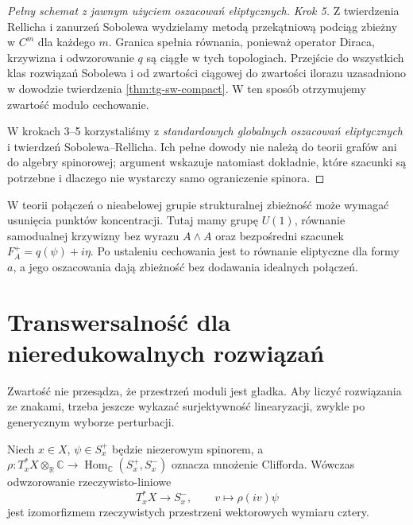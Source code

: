 \begin{proof}[Pełny schemat z jawnym użyciem oszacowań eliptycznych]
\emph{Krok 5.} Z twierdzenia Rellicha i zanurzeń Sobolewa
wydzielamy metodą przekątniową podciąg zbieżny w $C^m$
dla każdego $m$. Granica spełnia równania, ponieważ
operator Diraca, krzywizna i odwzorowanie $q$ są ciągłe
w tych topologiach. Przejście do wszystkich klas
rozwiązań Sobolewa i od zwartości ciągowej
do zwartości ilorazu uzasadniono w dowodzie
twierdzenia \ref{thm:tg-sw-compact}.
W ten sposób otrzymujemy zwartość modulo cechowanie.

W krokach 3--5 korzystaliśmy z \emph{standardowych globalnych
oszacowań eliptycznych} i twierdzeń Sobolewa--Rellicha.
Ich pełne dowody nie należą do teorii grafów ani do
algebry spinorowej; argument wskazuje natomiast dokładnie,
które szacunki są potrzebne i dlaczego nie wystarczy samo
ograniczenie spinora.
\end{proof}

\begin{uwaga}
W teorii połączeń o nieabelowej grupie strukturalnej
zbieżność może wymagać usunięcia punktów koncentracji.
Tutaj mamy grupę $U(1)$, równanie samodualnej krzywizny
bez wyrazu $A\wedge A$ oraz bezpośredni szacunek
$F_A^+=q(\psi)+i\eta$. Po ustaleniu cechowania jest to
równanie eliptyczne dla formy $a$, a jego oszacowania
dają zbieżność bez dodawania idealnych połączeń.
\end{uwaga}

\section{Transwersalność dla nieredukowalnych rozwiązań}
\label{sec:tg-sw12-transversality}

Zwartość nie przesądza, że przestrzeń moduli jest gładka.
Aby liczyć rozwiązania ze znakami, trzeba jeszcze wykazać
surjektywność linearyzacji, zwykle po generycznym wyborze
perturbacji.

\begin{lemat}
\label{lem:tg-sw12-clifford-real-iso}
Niech $x\in X$, $\psi\in S_x^+$ będzie
niezerowym spinorem, a
$\rho:T_x^*X\otimes_{\mathbb R}\mathbb C
\to\operatorname{Hom}_{\mathbb C}(S_x^+,S_x^-)$
oznacza mnożenie Clifforda.
Wówczas odwzorowanie rzeczywisto-liniowe
\[
T_x^*X\longrightarrow S_x^-,
\qquad v\longmapsto\rho(iv)\psi
\]
jest izomorfizmem rzeczywistych przestrzeni
wektorowych wymiaru cztery.
\end{lemat}


